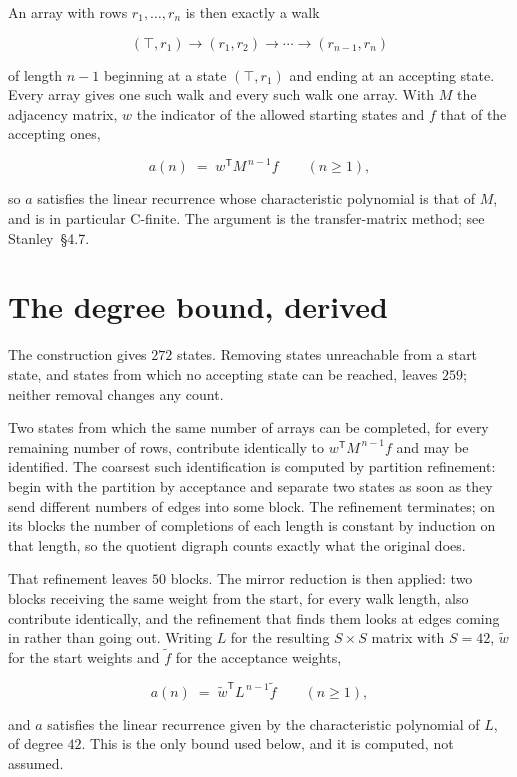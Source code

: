 \documentclass[11pt]{article}
\theoremstyle{definition}
\begin{document}
An array with rows $r_1,\dots,r_n$ is then exactly a walk

\[(\top,r_1) \to (r_1,r_2) \to \cdots \to (r_{n-1},r_n)\]

of length $n-1$ beginning at a state $(\top,r_1)$ and ending at an accepting state. Every array gives one such walk and every such walk one array. With $M$ the adjacency matrix, $w$ the indicator of the allowed starting states and $f$ that of the accepting ones,

\[a(n) \;=\; w^{\mathsf T} M^{\,n-1} f \qquad (n \ge 1),\]

so $a$ satisfies the linear recurrence whose characteristic polynomial is that of $M$, and is in particular C-finite. The argument is the transfer-matrix method; see Stanley~\S4.7.

\section{The degree bound, derived}

The construction gives $272$ states. Removing states unreachable from a start state, and states from which no accepting state can be reached, leaves $259$; neither removal changes any count.

Two states from which the same number of arrays can be completed, for every remaining number of rows, contribute identically to $w^{\mathsf T}M^{\,n-1}f$ and may be identified. The coarsest such identification is computed by partition refinement: begin with the partition by acceptance and separate two states as soon as they send different numbers of edges into some block. The refinement terminates; on its blocks the number of completions of each length is constant by induction on that length, so the quotient digraph counts exactly what the original does.

That refinement leaves $50$ blocks. The mirror reduction is then applied: two blocks receiving the same weight from the start, for every walk length, also contribute identically, and the refinement that finds them looks at edges coming in rather than going out. Writing $L$ for the resulting $S \times S$ matrix with $S = 42$, $\tilde w$ for the start weights and $\tilde f$ for the acceptance weights,

\[a(n) \;=\; \tilde w^{\mathsf T} L^{\,n-1} \tilde f \qquad (n \ge 1),\]

and $a$ satisfies the linear recurrence given by the characteristic polynomial of $L$, of degree $42$. This is the only bound used below, and it is computed, not assumed.
\end{document}

